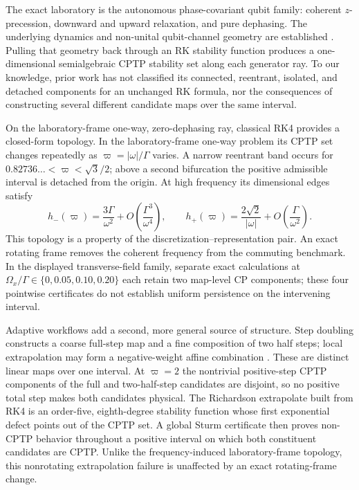 The exact laboratory is the autonomous phase-covariant qubit family: coherent $z$-precession, downward and upward relaxation, and pure dephasing. The underlying dynamics and non-unital qubit-channel geometry are established \cite{FujiwaraAlgoet1999,RuskaiSzarekWerner2002,BraunEtAl2014,Hall2008Complete,Lankinen2016Complete,Filippov2020Phase,Siudzinska2022Mixtures,Siudzinska2023Geometry,LonigroChruscinski2023}. Pulling that geometry back through an RK stability function produces a one-dimensional semialgebraic CPTP stability set along each generator ray. To our knowledge, prior work has not classified its connected, reentrant, isolated, and detached components for an unchanged RK formula, nor the consequences of constructing several different candidate maps over the same interval.

On the laboratory-frame one-way, zero-dephasing ray, classical RK4 provides a closed-form topology. In the laboratory-frame one-way problem its CPTP set changes repeatedly as $\varpi=|\omega|/\Gamma$ varies. A narrow reentrant band occurs for $0.82736\ldots<\varpi<\sqrt3/2$; above a second bifurcation the positive admissible interval is detached from the origin. At high frequency its dimensional edges satisfy
\begin{equation}
 h_-(\varpi)=\frac{3\Gamma}{\omega^2}+O\!\left(\frac{\Gamma^3}{\omega^4}\right),
 \qquad
 h_+(\varpi)=\frac{2\sqrt2}{|\omega|}+O\!\left(\frac{\Gamma}{\omega^2}\right).
 \label{eq:intro_window}
\end{equation}
This topology is a property of the discretization--representation pair. An exact rotating frame removes the coherent frequency from the commuting benchmark. In the displayed transverse-field family, separate exact calculations at $\Omega_x/\Gamma\in\{0,0.05,0.10,0.20\}$ each retain two map-level CP components; these four pointwise certificates do not establish uniform persistence on the intervening interval.

Adaptive workflows add a second, more general source of structure. Step doubling constructs a coarse full-step map and a fine composition of two half steps; local extrapolation may form a negative-weight affine combination \cite{Shampine1985Doubling,NussleinRanochaKetcheson2021,Szyszkowicz1985Richardson,ZlatevEtAl2017Richardson,HavasiKazemi2018Richardson}. These are distinct linear maps over one interval. At $\varpi=2$ the nontrivial positive-step CPTP components of the full and two-half-step candidates are disjoint, so no positive total step makes both candidates physical. The Richardson extrapolate built from RK4 is an order-five, eighth-degree stability function whose first exponential defect points out of the CPTP set. A global Sturm certificate then proves non-CPTP behavior throughout a positive interval on which both constituent candidates are CPTP. Unlike the frequency-induced laboratory-frame topology, this nonrotating extrapolation failure is unaffected by an exact rotating-frame change.

